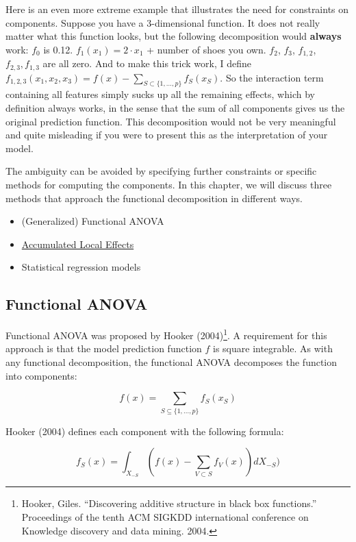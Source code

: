 \documentclass[
  12pt,
]{krantz}
\providecommand{\tightlist}{%
  \setlength{\itemsep}{0pt}\setlength{\parskip}{0pt}}
\begin{document}
Here is an even more extreme example that illustrates the need for constraints on components.
Suppose you have a 3-dimensional function.
It does not really matter what this function looks, but the following decomposition would \textbf{always} work:
\(f_0\) is 0.12.
\(f_1(x_1)=2\cdot{}x_1\) + number of shoes you own.
\(f_2\), \(f_3\), \(f_{1,2}\), \(f_{2,3}, f_{1,3}\) are all zero.
And to make this trick work, I define \(f_{1,2,3}(x_1,x_2,x_3)=f(x)-\sum_{S\subset\{1,\ldots,p\}}f_S(x_S)\).
So the interaction term containing all features simply sucks up all the remaining effects, which by definition always works, in the sense that the sum of all components gives us the original prediction function.
This decomposition would not be very meaningful and quite misleading if you were to present this as the interpretation of your model.

The ambiguity can be avoided by specifying further constraints or specific methods for computing the components.
In this chapter, we will discuss three methods that approach the functional decomposition in different ways.

\begin{itemize}
\tightlist
\item
  (Generalized) Functional ANOVA
\item
  \protect\hyperlink{ale}{Accumulated Local Effects}
\item
  Statistical regression models
\end{itemize}

\hypertarget{functional-anova}{%
\subsection{Functional ANOVA}\label{functional-anova}}

Functional ANOVA was proposed by Hooker (2004)\footnote{Hooker, Giles. ``Discovering additive structure in black box functions.'' Proceedings of the tenth ACM SIGKDD international conference on Knowledge discovery and data mining. 2004.}.
A requirement for this approach is that the model prediction function \(f\) is square integrable.
As with any functional decomposition, the functional ANOVA decomposes the function into components:

\[f(x) = \sum_{S\subseteq\{1,\ldots,p\}} f_S(x_S)\]

Hooker (2004) defines each component with the following formula:

\[f_S(x) = \int_{X_{-S}} \left( f(x) - \sum_{V \subset S} f_V(x)\right) d X_{-S})\]
\end{document}
